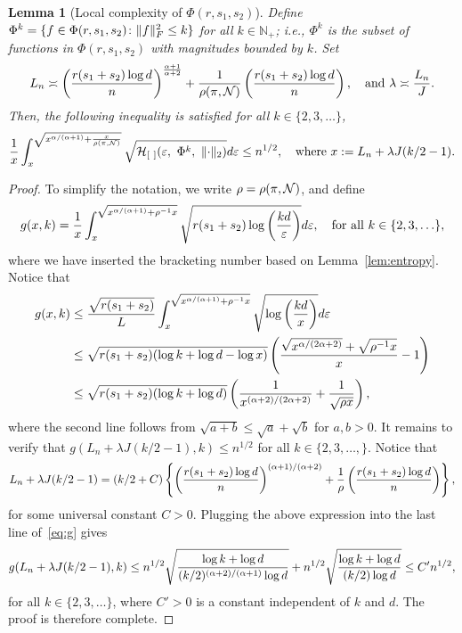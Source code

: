 \documentclass[11pt]{article}
\theoremstyle{plain}
\newtheorem{lem}{Lemma}
\theoremstyle{definition}
\begin{document}
\begin{lem}[Local complexity of $\Phi(r,s_1,s_2)$] \label{lem:metric}
Define $\Phi^{k}=\{f\in\Phi(r,s_1,s_2)\colon \lVert f\rVert_F^2\leq k\}$ for all $k\in\mathbb{N}_{+}$; i.e., $\Phi^k$ is the subset of functions in $\Phi(r,s_1,s_2)$ with magnitudes bounded by $k$. Set 
\begin{equation}\label{eq:specification}
L_n\asymp \left({r(s_1+s_2)\log d \over n } \right)^{\alpha+1\over \alpha+2} + {1\over \rho (\pi, \tN)}\left({r(s_1+s_2)\log d \over n } \right),\quad \text{and}\ 
\lambda \asymp {L_n\over J}.
\end{equation}
Then, the following inequality is satisfied for all $k\in\{2,3,\ldots\}$,
\begin{equation}
{1\over x}\int^{\sqrt{x^{\alpha/(\alpha+1)}+{x\over \rho (\pi, \mathcal{N})}}}_{x} \sqrt{\mathcal{H}_{[\ ]}(\varepsilon,\ \Phi^{k},\ \lVert\cdot\rVert_2) }d\varepsilon \leq n^{1/2}, \quad \text{where}\ x:=L_n+\lambda J(k/2-1).
\end{equation}
\end{lem}
\begin{proof}
To simplify the notation, we write $\rho=\rho(\pi, \mathcal{N})$, and define
\begin{equation}\label{eq:complexity}
g(x, k)={1\over x}\int^{\sqrt{x^{\alpha/(\alpha+1)}+\rho^{-1}x}}_{x} \sqrt{r(s_1+s_2)\log\left({kd\over \varepsilon}\right)}d\varepsilon,\quad \text{for all }k\in\{2,3,\ldots\},
\end{equation}
where we have inserted the bracketing number based on Lemma~\ref{lem:entropy}.  Notice that
\begin{align}\label{eq:g}
g(x,k)&\leq {\sqrt{r(s_1+s_2)}\over L}\int_{x}^{\sqrt{x^{\alpha/(\alpha+1)}+\rho^{-1}x}}\sqrt{\log \left(kd \over x \right)}d\varepsilon\notag \\
&\leq \sqrt{r(s_1+s_2)(\log k+\log d - \log x)}\left({\sqrt{x^{\alpha/(2\alpha+2)}}+\sqrt{\rho^{-1}x} \over x }-1\right)\notag \\
&\leq  \sqrt{r(s_1+s_2)(\log k+\log d)}\left( {1\over x^{(\alpha+2)/(2\alpha+2)}}+{1\over \sqrt{\rho x}}\right),
\end{align}
where the second line follows from $\sqrt{a+b} \leq \sqrt{a}+\sqrt{b}$ for $a,b>0$.
It remains to verify that $g(L_n+\lambda J(k/2-1), k) \leq n^{1/2}$ for all $k\in\{2,3,\ldots,\}$. Notice that
\[
L_n+\lambda J(k/2-1)=(k/2+C)\left\{\left( {r(s_1+s_2)\log d \over n}\right)^{(\alpha+1)/(\alpha+2)}+{1\over \rho}\left( {r(s_1+s_2)\log d \over n}\right)\right\},
\]
for some universal constant $C>0$. Plugging the above expression into the last line of~\eqref{eq:g} gives
\[
g(L_n+\lambda J(k/2-1),k)\leq n^{1/2}\sqrt{\log k+\log d\over (k/2)^{(\alpha+2)/(\alpha+1)} \log d}+n^{1/2}\sqrt{\log k+\log d \over (k/2) \log d }\leq C'n^{1/2},
\]
for all $k\in\{2,3,\ldots\}$, where $C'>0$ is a constant independent of $k$ and $d$. The proof is therefore complete. 
\end{proof}
\end{document}
